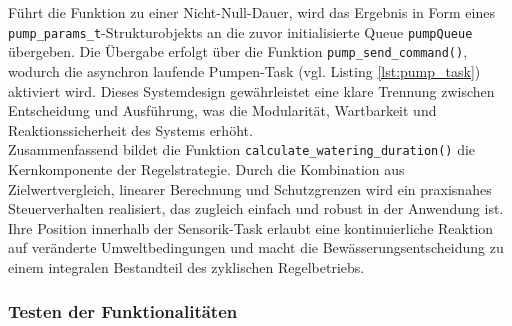 \noindent Führt die Funktion zu einer Nicht-Null-Dauer, wird das Ergebnis in Form eines \\\texttt{pump\_params\_t}-Strukturobjekts an die zuvor initialisierte Queue \texttt{pumpQueue} übergeben. Die Übergabe erfolgt über die Funktion \texttt{pump\_send\_command()}, wodurch die asynchron laufende Pumpen-Task (vgl. Listing \vref{lst:pump_task}) aktiviert wird. Dieses Systemdesign gewährleistet eine klare Trennung zwischen Entscheidung und Ausführung, was die Modularität, Wartbarkeit und Reaktionssicherheit des Systems erhöht.
\\
Zusammenfassend bildet die Funktion \texttt{calculate\_watering\_duration()} die Kernkomponente der Regelstrategie. Durch die Kombination aus Zielwertvergleich, linearer Berechnung und Schutzgrenzen wird ein praxisnahes Steuerverhalten realisiert, das zugleich einfach und robust in der Anwendung ist. Ihre Position innerhalb der Sensorik-Task erlaubt eine kontinuierliche Reaktion auf veränderte Umweltbedingungen und macht die Bewässerungsentscheidung zu einem integralen Bestandteil des zyklischen Regelbetriebs.

\subsubsection{Testen der Funktionalitäten}


